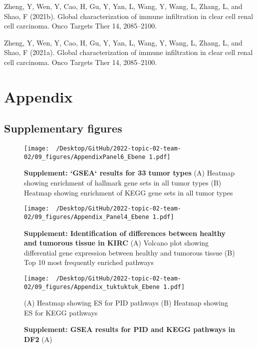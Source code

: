 \documentclass[
  parskip,
  oneside]{\documentclass[oneside]{book}}
\newlength{\cslhangindent}
\newlength{\cslentryspacingunit} %
\newenvironment{CSLReferences}[2] %
 {%
  \setlength{\parindent}{0pt}
  \ifodd #1
  \let\oldpar\par
  \def\par{\hangindent=\cslhangindent\oldpar}
  \fi
  \setlength{\parskip}{#2\cslentryspacingunit}
 }%
 {}
\begin{document}
\begin{CSLReferences}{0}{0}
\leavevmode{}%
Zheng, Y, Wen, Y, Cao, H, Gu, Y, Yan, L, Wang, Y, Wang, L, Zhang, L, and
Shao, F (2021b). Global characterization of immune infiltration in clear
cell renal cell carcinoma. Onco Targets Ther 14, 2085--2100.

\leavevmode{}%
Zheng, Y, Wen, Y, Cao, H, Gu, Y, Yan, L, Wang, Y, Wang, L, Zhang, L, and
Shao, F (2021a). Global characterization of immune infiltration in clear
cell renal cell carcinoma. Onco Targets Ther 14, 2085--2100.

\end{CSLReferences}

\hypertarget{appendix}{%
\section{Appendix}\label{appendix}}

\hypertarget{supplementary-figures}{%
\subsection{Supplementary figures}\label{supplementary-figures}}

\begin{figure}[h]
  \texttt{[image: ~/Desktop/GitHub/2022-topic-02-team-02/09\_figures/AppendixPanel6\_Ebene 1.pdf]}
  \caption{\textbf{Supplement: `GSEA` results for 33 tumor types} (A) Heatmap showing enrichment of hallmark gene sets in all tumor types (B) Heatmap showing enrichment of KEGG gene sets in all tumor types}
  \label{hmap}
\end{figure}

\begin{figure}[h]
 \begin{center}
   \texttt{[image: ~/Desktop/GitHub/2022-topic-02-team-02/09\_figures/Appendix\_Panel4\_Ebene 1.pdf]}
  \end{center}
  \caption{\textbf{Supplement: Identification of differences between healthy and tumorous tissue in KIRC } (A) Volcano plot showing differential gene expression between healthy and tumorous tissue (B) Top 10 most frequently enriched pathways}
  \label{volcanoap}
\end{figure}

\begin{figure}[h]
 \begin{center}
   \texttt{[image: ~/Desktop/GitHub/2022-topic-02-team-02/09\_figures/Appendix\_tuktuktuk\_Ebene 1.pdf]}
  \end{center}
  \caption{\textbf{Supplement: GSEA results for PID and KEGG pathways in DF2 } (A) } (A) Heatmap showing ES for PID pathways (B) Heatmap showing ES for KEGG pathways
  \label{tuk}
\end{figure}
\end{document}

